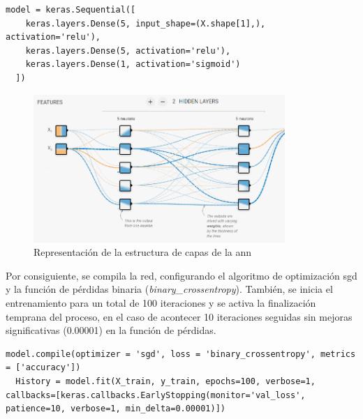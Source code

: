 \vspace{3mm}

\begin{lstlisting}[style=Python, caption={Definición del modelo de ANN de Keras}]
  model = keras.Sequential([
    keras.layers.Dense(5, input_shape=(X.shape[1],), activation='relu'), 
    keras.layers.Dense(5, activation='relu'),
    keras.layers.Dense(1, activation='sigmoid') 
  ]) 
\end{lstlisting}

\vspace{3mm}

\begin{figure}[H]
  \centering
  \includegraphics[width=0.85\textwidth]{img/desarrollo/ann/neuronas.png}
  \caption{Representación de la estructura de capas de la \gls{ann} \cite{tensorflow}}
  \label{fig:neuronas}
\end{figure}

\vspace{3mm}

Por consiguiente, se compila la red, configurando el algoritmo de optimización \gls{sgd} y la función de pérdidas binaria (\textit{binary\_crossentropy}). También, se inicia el entrenamiento para un total de 100 iteraciones y se activa la finalización temprana del proceso, en el caso de acontecer 10 iteraciones seguidas sin mejoras significativas (0.00001) en la función de pérdidas. \cite{early}

\vspace{3mm}

\begin{lstlisting}[style=Python, caption={Entrenamiento del modelo de ANN de Keras}]
  model.compile(optimizer = 'sgd', loss = 'binary_crossentropy', metrics = ['accuracy'])
  History = model.fit(X_train, y_train, epochs=100, verbose=1, callbacks=[keras.callbacks.EarlyStopping(monitor='val_loss', patience=10, verbose=1, min_delta=0.00001)])
\end{lstlisting}

